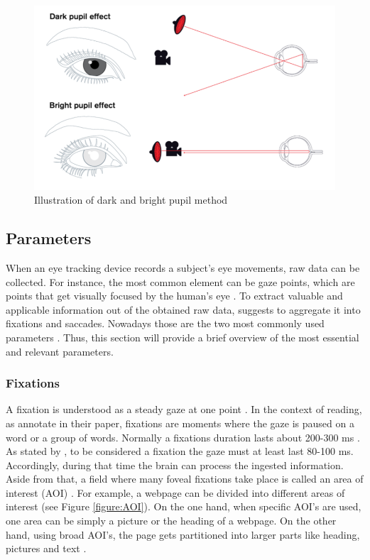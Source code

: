 \begin{figure}[!ht]
    \centering
    \includegraphics[width=1\linewidth]{images/DarkBright.png}
    \caption{
        Illustration of dark and bright pupil method  \autocite[]{tobii2018dark}
    }
    \label{figure:DarkBright}
\end{figure}


\subsection{Parameters}
\label{subsection:Parameters}
When an eye tracking device records a subject's eye movements, raw data can be collected. For instance, the most common element can be gaze points, which are points that get visually focused by the human's eye \autocite{bojko2009informative, vspakov2007visualization}. To extract valuable and applicable information out of the obtained raw data, \textcite[]{blascheck2014state}  suggests to aggregate it into fixations and saccades. 
Nowadays those are the two most commonly used parameters \autocite{bruneau2002eyes}. Thus, this section will provide a brief overview of the most essential and relevant parameters.

\subsubsection{Fixations}
A fixation is understood as a steady gaze at one point \autocite[]{buscher2009you}.  In the context of reading, as \textcite[]{beymer2007eye} annotate in their paper, fixations are moments where the gaze is paused on a word or a group of words. 
Normally a fixations duration lasts about 200-300 ms \autocite[]{kasneci2015online}. As stated by \textcite[]{buscher2009you}, to be considered a fixation the gaze must at least last 80-100 ms. Accordingly, during that time the brain can process the ingested information. Aside from that, a field where many foveal fixations take place is called an area of interest (AOI) \autocite[]{djamasbi2014eye}. For example, a webpage can be divided into different areas of interest (see Figure \ref{figure:AOI}).  On the one hand, when specific AOI's are used, one area can be simply a picture or the heading of a webpage. On the other hand, using broad AOI's, the page gets partitioned into larger parts like heading, pictures and text \autocite{djamasbi2014eye}. \\

